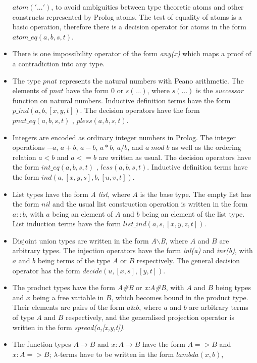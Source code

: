 \documentclass[11pt]{report}
\begin{document}
\begin{itemize}
 \hbox{$atom('...')$}, to avoid ambiguities between
 type theoretic atoms and other constructs represented by
 Prolog atoms. The test of equality of atoms is a basic
 operation, therefore there is a decision operator for atoms 
 in the form \hbox{$atom\_eq(a,b,s,t)$}.
 \item
 There is one impossibility operator of the form \emph{any(x)}
 which maps a proof of a contradiction into any type.
 \item
 The type $pnat$ represents the natural numbers with Peano
 arithmetic. The elements of $pnat$ have the form $0$ or $s(...)$,
 where $s(...)$ is the \emph{successor} function on natural numbers.
 Inductive definition terms have the form $p\_ind(a,b,[x,y,t])$.
 The decision operators have the form
 $pnat\_eq(a,b,s,t)$ , $pless(a,b,s,t)$.
 \item
 Integers are encoded as ordinary integer numbers in Prolog.
 The integer operations $-a$, $a+b$, $a-b$, $a*b$, $a/b$, and
 $a\; mod\; b$
 as well as the ordering relation $a<b$ and $a<=b$ are written 
 as usual.
 The decision operators have the form
 $int\_eq(a,b,s,t)$ , $less(a,b,s,t)$.
 Inductive definition terms have the form $ind(a,[x,y,s],b,[u,v,t])$.
 \item
 List types have the form \emph{A list}, where $A$ is the
 base type. The empty list 
 has the form $nil$ and the usual list construction operation 
 is written in the form $a::b$, with $a$ being an element of $A$ 
 and $b$ being an element of the list type.
 List induction terms have the 
 form \hbox{$list\_ind(a,s,[x,y,z,t])$}.
 \item
 Disjoint union types are written in the form 
 \emph{A$\backslash$B}, where $A$ and $B$ are arbitrary types.
 The injection operators have the form \emph{inl(a)} 
 and \emph{inr(b)}, with $a$ and $b$ being terms of the type $A$ or
 $B$ respectively. The general decision operator has the form
 \hbox{$decide(u,[x,s],[y,t])$}.
 \item
 The product types have the form \emph{A\#B} or \emph{x:A\#B},
 with $A$ and $B$ being types and $x$ being a free variable in $B$,
 which becomes bound in the product type.
 Their elements are pairs of the form $a\&b$, where $a$ and $b$ are
 arbitrary terms of type $A$ and $B$ respectively, and the 
 generalised projection operator is written
 in the form \emph{spread(a,[x,y,t])}.
 \item
 The function types $A \rightarrow B$ and $x:A\rightarrow B$ have
 the form $A=>B$ and $x:A=>B$;
 $\lambda$-terms have to be written in the form $lambda(x,b)$,

\end{itemize}
\end{document}
